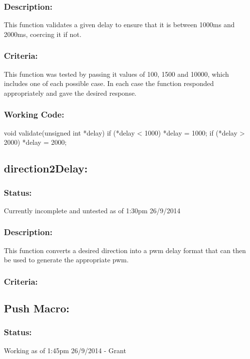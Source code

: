 \documentclass[]{article}
\begin{document}
\subsubsection{Description:}
This function validates a given delay to ensure that it is between 1000ms and 2000ms, coercing it if not.

\subsubsection{Criteria:}
This function was tested by passing it values of 100, 1500 and 10000, which includes one of each possible case. In each case the function responded appropriately and gave the desired response.

\subsubsection{Working Code:}
void validate(unsigned int *delay)
{
	if (*delay < 1000)
	{
		*delay = 1000;
	}
	if (*delay > 2000)
	{
		*delay = 2000;
	}
}

\subsection{direction2Delay:}
\subsubsection{Status:}
Currently incomplete and untested as of 1:30pm 26/9/2014

\subsubsection{Description:}
This function converts a desired direction into a pwm delay format that can then be used to generate the appropriate pwm.

\subsubsection{Criteria:}

\newpage
\subsection{Push Macro:}
\subsubsection{Status:}
Working as of 1:45pm 26/9/2014 - Grant
\end{document}
